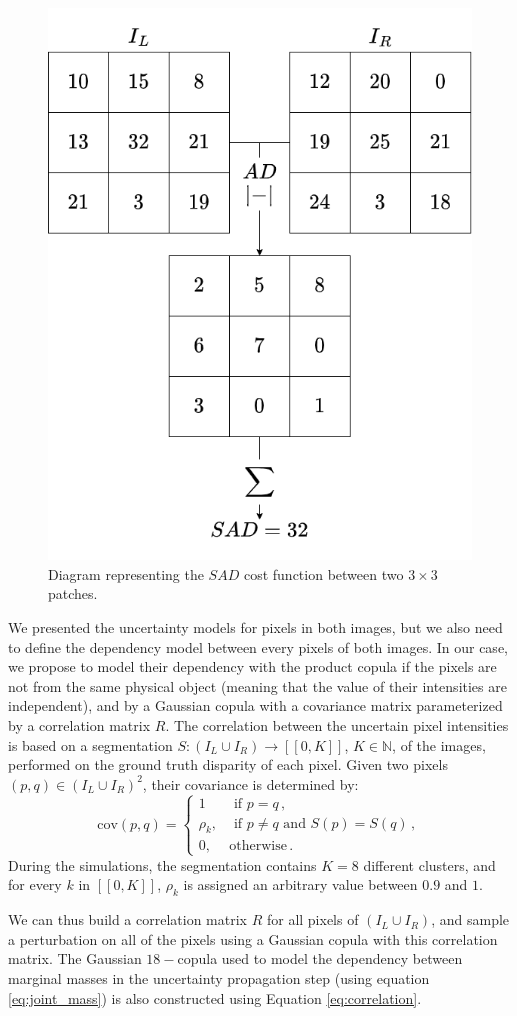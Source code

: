 \begin{figure}
    \centering
    \includegraphics[width=0.5\linewidth]{Images/SAD.png}
    \caption{Diagram representing the $SAD$ cost function between two $3\times3$ patches.}
    \label{fig:SAD}
\end{figure}

We presented the uncertainty models for pixels in both images, but we also need to define the dependency model between every pixels of both images. In our case, we propose to model their dependency with the product copula if the pixels are not from the same physical object (meaning that the value of their intensities are independent), and by a Gaussian copula with a covariance matrix parameterized by a correlation matrix $R$. The correlation between the uncertain pixel intensities is based on a segmentation $S:(I_L\cup I_R)\rightarrow[\![0,K]\!]$, $K\in\mathbb{N}$, of the images, performed on the ground truth disparity of each pixel. Given two pixels $(p, q)\in(I_L\cup I_R)^2$, their covariance is determined by:
\begin{equation}
    \mathrm{cov}(p, q) =
    \begin{cases}
        1 &\text{ if }p=q\,,\\
        \rho_k, &\text{ if } p\ne q\text{ and }S(p)=S(q)\,, \\
        0, & \text{otherwise}\,.
    \end{cases}\label{eq:correlation}
\end{equation}
During the simulations, the segmentation contains $K=8$ different clusters, and for every $k$ in $[\![0,K]\!]$, $\rho_k$ is assigned an arbitrary value between $0.9$ and $1$.

We can thus build a correlation matrix $R$ for all pixels of $(I_L\cup I_R)$, and sample a perturbation on all of the pixels using a Gaussian copula with this correlation matrix. The Gaussian $18-$copula used to model the dependency between marginal masses in the uncertainty propagation step (using equation \eqref{eq:joint_mass}) is also constructed using Equation \eqref{eq:correlation}. 

